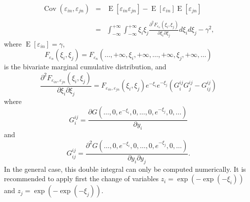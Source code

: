 \documentclass[12pt,a4paper]{article}
\newcommand{\expect}{\operatorname{E}}
\newcommand{\cov}{\operatorname{Cov}}
\begin{document}
\begin{itemize}
\begin{equation}
\label{eq:covMev}
\begin{array}{rcl}
\cov(\varepsilon_{in},\varepsilon_{jn}) &=& \expect[\varepsilon_{in} \varepsilon_{jn}] - \expect[\varepsilon_{in}]  \expect[\varepsilon_{jn}] \\ && \\
&=& \displaystyle  \int_{-\infty}^{+\infty} \int_{-\infty}^{+\infty}\xi_i \xi_j \frac{\partial^2 F_{\varepsilon_n} (\xi_i,\xi_j)}{\partial \xi_i \partial \xi_j } d\xi_i d\xi_j -  \gamma^2,
\end{array}
\end{equation}
where $\expect[\varepsilon_{in}]=\gamma$,
\begin{equation}
\label{eq:doubleMarginal}
F_{\varepsilon_n} (\xi_i,\xi_j) = F_{\varepsilon_n}(\ldots,+\infty, \xi_i,+\infty,\ldots,+\infty,\xi_j,+\infty,\ldots)
\end{equation}
is the bivariate marginal cumulative distribution, and
\begin{equation}
 \frac{\partial^2 F_{\varepsilon_{in},\varepsilon_{jn}} (\xi_i,\xi_j)}{\partial \xi_i \partial \xi_j } = F_{\varepsilon_{in},\varepsilon_{jn}} (\xi_i,\xi_j) e^{-\xi_i}e^{-\xi_j} (G^{ij}_i G^{ij}_j - G^{ij}_{ij})
\end{equation}
where 
\begin{equation}
\label{eq:giji}
G^{ij}_i = \frac{\partial G(\ldots,0,e^{-\xi_i},0,\ldots,0,e^{-\xi_j},0,\ldots)}{\partial y_i}
\end{equation}
and
\begin{equation}
\label{eq:gijij}
G^{ij}_{ij} = \frac{\partial^2 G(\ldots,0,e^{-\xi_i},0,\ldots,0,e^{-\xi_j},0,\ldots)}{\partial y_i \partial y_j }.
\end{equation}
In the general case, this double integral can only be computed
numerically. It is recommended to apply first the change of variables
$z_i=\exp(-\exp(-\xi_i))$ and $z_j=\exp(-\exp(-\xi_j))$.


\end{itemize}
\end{document}
